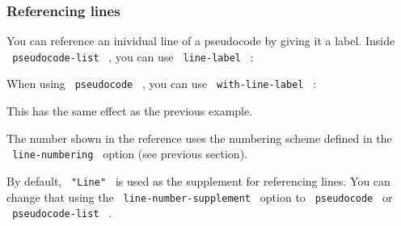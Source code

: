 \pandocbounded{}

\subsubsection{Referencing lines}\label{referencing-lines}

You can reference an inividual line of a pseudocode by giving it a
label. Inside \texttt{\ pseudocode-list\ } , you can use
\texttt{\ line-label\ } :

\begin{Shaded}
\begin{Highlighting}[]
\NormalTok{\#pseudocode{-}list[}
\NormalTok{]}

\end{Highlighting}
\end{Shaded}

\pandocbounded{}

When using \texttt{\ pseudocode\ } , you can use
\texttt{\ with-line-label\ } :

\begin{Shaded}
\begin{Highlighting}[]
\NormalTok{)}

\end{Highlighting}
\end{Shaded}

This has the same effect as the previous example.

The number shown in the reference uses the numbering scheme defined in
the \texttt{\ line-numbering\ } option (see previous section).

By default, \texttt{\ "Line"\ } is used as the supplement for
referencing lines. You can change that using the
\texttt{\ line-number-supplement\ } option to \texttt{\ pseudocode\ } or
\texttt{\ pseudocode-list\ } .

